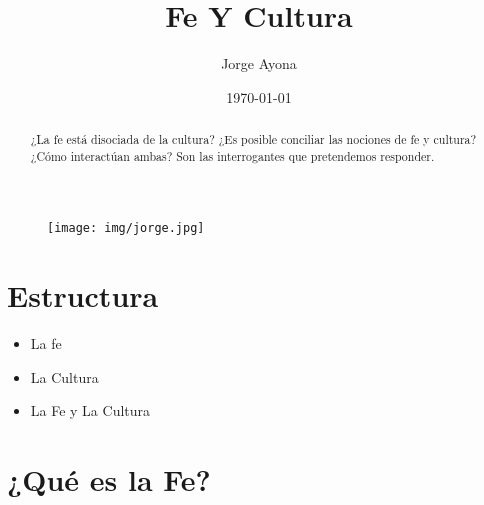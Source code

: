 \documentclass[a4paper,12pt,oneside]{article}
\title{Fe Y Cultura}
\author{Jorge Ayona}
\date{\today}
\begin{document}
\maketitle
\begin{figure}[h]
    \centering
   \texttt{[image: img/jorge.jpg]}  %
    \caption{}
    \label{fig:logo}
\end{figure}

\begin{abstract}
    ¿La fe está disociada de la cultura? ¿Es posible conciliar las nociones de fe y cultura? ¿Cómo interactúan ambas? Son las interrogantes que pretendemos responder.
\end{abstract}
\pagestyle{empty}

\section*{Estructura}

\begin{itemize}
    \item La fe
    \item La Cultura
    \item La Fe y La Cultura
\end{itemize}

\section*{¿Qué es la Fe?}
\end{document}
